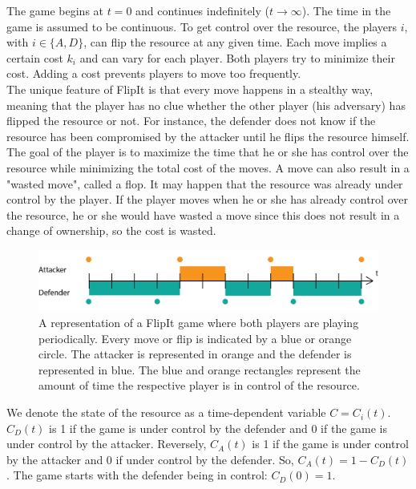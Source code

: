 The game begins at $t=0$ and continues indefinitely ($t \rightarrow \infty $). The time in the game is assumed to be continuous. To get control over the resource, the players $i$, with $i \in \{A,D\}$, can flip the resource at any given time. 
Each move implies a certain cost $k_{i}$ and can vary for each player. Both players try to minimize their cost. Adding a cost prevents players to move too frequently. \\

The unique feature of FlipIt is that every move happens in a stealthy way, meaning that the player has no clue whether the other player (his adversary) has flipped the resource or not. For instance, the defender does not know if the resource has been compromised by the attacker until he flips the resource himself. The goal of the player is to maximize the time that he or she has control over the resource while minimizing the total cost of the moves. A move can also result in a "wasted move", called a flop. It may happen that the resource was already under control by the player. If the player moves when he or she has already control over the resource, he or she would have wasted a move since this does not result in a change of ownership, so the cost is wasted. \\


\begin{figure}[hbtp]
\centering
\includegraphics[scale=0.7]{../../doc/template/Images/DefFlipItt.png}
\caption{A representation of a FlipIt game where both players are playing periodically. Every move or flip is indicated by a blue or orange circle. The attacker is represented in orange and the defender is represented in blue. The blue and orange rectangles represent the amount of time the respective player is in control of the resource.}
\label{fig:FLipItDefault}
\end{figure}



We denote the state of the resource as a time-dependent variable $C=C_{i}(t)$. 
$C_{D}(t)$ is 1 if the game is under control by the defender and 0 if the game is under control by the attacker. Reversely, $C_{A}(t)$ is 1 if the game is under control by the attacker and 0 if under control by the defender. So, $C_{A}(t)= 1 - C_{D}(t)$.
The game starts with the defender being in control: $C_{D}(0)= 1$. \\



